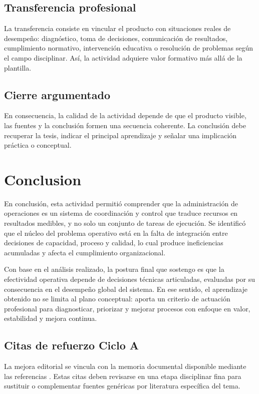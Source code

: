 \documentclass[
	spanish,
	letterpaper, oneside
]{article}
\begin{document}
\subsection*{Transferencia profesional}
La transferencia consiste en vincular el producto con situaciones reales de desempeño: diagnóstico, toma de decisiones, comunicación de resultados, cumplimiento normativo, intervención educativa o resolución de problemas según el campo disciplinar. Así, la actividad adquiere valor formativo más allá de la plantilla.

\subsection*{Cierre argumentado}
En consecuencia, la calidad de la actividad depende de que el producto visible, las fuentes y la conclusión formen una secuencia coherente. La conclusión debe recuperar la tesis, indicar el principal aprendizaje y señalar una implicación práctica o conceptual.


\section{Conclusion}

En conclusión, esta actividad permitió comprender que la administración de operaciones es un sistema de coordinación y control que traduce recursos en resultados medibles, y no solo un conjunto de tareas de ejecución. Se identificó que el núcleo del problema operativo está en la falta de integración entre decisiones de capacidad, proceso y calidad, lo cual produce ineficiencias acumuladas y afecta el cumplimiento organizacional.

Con base en el análisis realizado, la postura final que sostengo es que la efectividad operativa depende de decisiones técnicas articuladas, evaluadas por su consecuencia en el desempeño global del sistema. En ese sentido, el aprendizaje obtenido no se limita al plano conceptual: aporta un criterio de actuación profesional para diagnosticar, priorizar y mejorar procesos con enfoque en valor, estabilidad y mejora continua.




\subsection*{Citas de refuerzo Ciclo A}
La mejora editorial se vincula con la memoria documental disponible mediante las referencias \citep{unadm100TecnicasDidacticas2023,cicloARefuerzo02,cicloARefuerzo03,cicloARefuerzo04,cicloARefuerzo05}. Estas citas deben revisarse en una etapa disciplinar fina para sustituir o complementar fuentes genéricas por literatura específica del tema.
\end{document}
